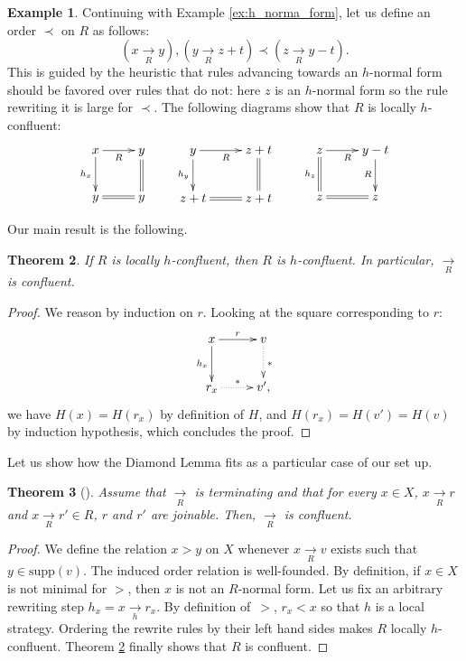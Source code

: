 \documentclass[10pt]{easychair}
\newtheorem{theorem}{Theorem}[section]
\theoremstyle{definition}
\newtheorem{example}[theorem]{Example}
\newcommand\supp{\text{supp}}
\newcommand\rewR{\underset{R}{\longrightarrow}}
\newcommand\rewh{\underset{h}{\longrightarrow}}
\begin{document}
\begin{example}
Continuing with Example \ref{ex:h_norma_form}, let us define an order $\prec$ on $R$ as follows:
\[
(x \rewR y), (y \rewR z + t) \prec (z \rewR y - t).
\]
This is guided by the heuristic that rules advancing towards an $h$-normal form should be favored over rules that do not: here $z$ is an $h$-normal form so the rule rewriting it is large for $\prec$. The following diagrams show that $R$ is locally $h$-confluent:
\[
   \xymatrix @C = 2.5em @R = 2.5em{
   x \ar [r] _{R}  
    \ar [d] _{h_x}   
   & y 
   \ar@{=} [d]
   \\
    y
    \ar@{=} [r]
    & y
    }
    \qquad
   \xymatrix @C = 2.5em @R = 2.5em{
   y \ar [r] _{R}  
    \ar [d] _{h_y}   
   & z + t
   \ar@{=} [d]
   \\
    z + t
    \ar@{=} [r]
    & z + t
    }
     \qquad
   \xymatrix @C = 2.5em @R = 2.5em{
   z \ar [r] _{R}  
    \ar@{=} [d] _{h_z}   
   & y - t
   \ar [d] _{R}
   \\
    z
    \ar@{=} [r]
    & z
    }
\]    
\end{example}
\medskip

Our main result is the following.
\smallskip

\begin{theorem}\label{thm:confluence_criterion}
  If $R$ is locally $h$-confluent, then $R$ is $h$-confluent. In particular, $\rewR$ is confluent.
\end{theorem}

\begin{proof}
 We reason by induction on $r$. Looking at the square corresponding to $r$:
  \[
    \xymatrix @C = 2.5em @R = 2.5em{
    x 
    \ar [r] ^{r}
    \ar[d] _{h_x}
     &
      v
      \ar@{.>} [d] ^{*}
      \\
      r_x
      \ar@{.>} [r] ^{*}
      & 
      v',
    }
  \]
 we have $H(x) = H(r_x)$ by definition of $H$, and $H(r_x) = H(v') = H(v)$ by induction hypothesis, which concludes the proof.
\end{proof}
\medskip


Let us show how the Diamond Lemma fits as a particular case of our set up.
\smallskip

\begin{theorem}[\cite{MR506890}]\label{thm:diamond_lemma}
  Assume that $\rewR$ is terminating and that for every $x\in X$, $x\rewR r$ and $x\rewR r'\in R$, $r$ and $r'$ are joinable. Then, $\rewR$ is confluent.
\end{theorem}

\begin{proof}
  We define the relation $x > y$ on $X$ whenever $x \rewR v$ exists such that $y\in\supp(v)$. The induced order relation is well-founded. By definition, if $x \in X$ is not minimal for $>$, then $x$ is not an $R$-normal form. Let us fix an arbitrary rewriting step $h_x= x \rewh r_x$.  By definition of~$>$, $r_x < x$ so that $h$ is a local strategy. Ordering the rewrite rules by their left hand sides makes $R$ locally $h$-confluent. Theorem \ref{thm:confluence_criterion} finally shows that $R$ is confluent.  
\end{proof}


\end{document}
